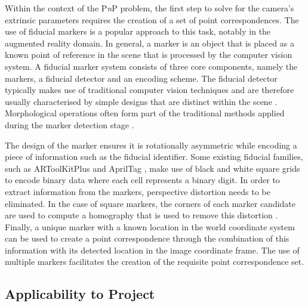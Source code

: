 Within the context of the P\textit{n}P problem, the first step to solve for the camera's extrinsic parameters requires the creation of a set of point correspondences. The use of fiducial markers is a popular approach to this task, notably in the augmented reality domain. In general, a marker is an object that is placed as a known point of reference in the scene that is processed by the computer vision system. A fiducial marker system consists of three core components, namely the markers, a fiducial detector and an encoding scheme. The fiducial detector typically makes use of traditional computer vision techniques and are therefore usually characterised by simple designs that are distinct within the scene \cite{Zhang:DeepTag_General_Framework_for_Fiducial_Marker_Design}. Morphological operations often form part of the traditional methods applied during the marker detection stage  \cite{Kostak:Designing_a_Simple_Fiducial_Marker}. 

The design of the marker ensures it is rotationally asymmetric while encoding a piece of information such as the fiducial identifier. Some existing fiducial families, such as ARToolKitPlus \cite{Wagner:ARToolKitPlus} and AprilTag \cite{Olson:AprilTag}, make use of black and white square grids to encode binary data where each cell represents a binary digit. In order to extract information from the markers, perspective distortion needs to be eliminated. In the case of square markers, the corners of each marker candidate are used to compute a homography that is used to remove this distortion \cite{Hirzer:Marker_Detection_for_Augmented_Reality_Applications}. Finally, a unique marker with a known location in the world coordinate system can be used to create a point correspondence through the combination of this information with its detected location in the image coordinate frame. The use of multiple markers facilitates the creation of the requisite point correspondence set.


\subsection{Applicability to Project}



